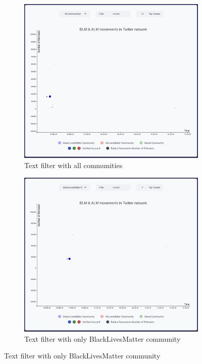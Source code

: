 \begin{figure}[H]
\begin{subfigure}{.45\textwidth}
  \centering
  \captionsetup{justification=centering}
  \includegraphics[width=0.9\linewidth]{./pics/allF.png}  
  \caption{Text filter with all communities}
  \label{fig:sub-first-tfac}
\end{subfigure}
\begin{subfigure}{.45\textwidth}
  \centering
  \captionsetup{justification=centering}
  \includegraphics[width=0.9\linewidth]{./pics/blmF.png}  
  \caption{Text filter with only BlackLivesMatter community}
  \label{fig:sub-second-tfblc}
\end{subfigure}


\end{figure}
